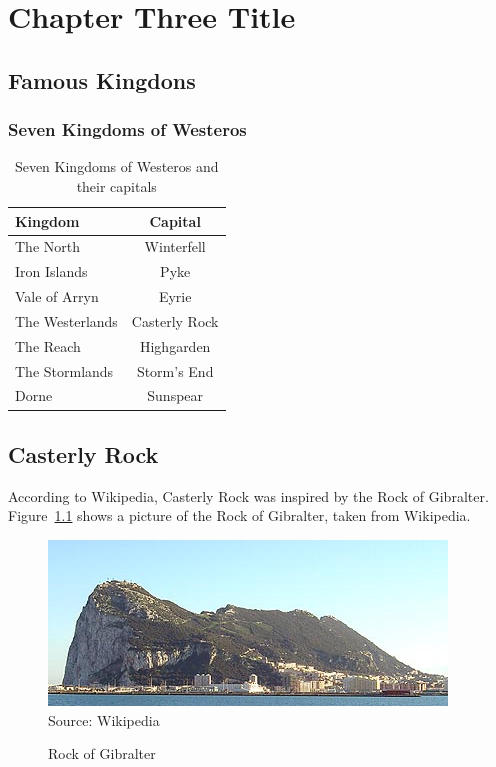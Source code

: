 
\chapter{Chapter Three Title}
\label{chap:chapterthreename}
\doublespacing
{}

\section{Famous Kingdons}

\subsection{Seven Kingdoms of Westeros}

\begin{table}
\centering
\caption{Seven Kingdoms of Westeros and their capitals}
\begin{tabular}{lc}
\toprule
Kingdom & Capital \\
\midrule
The North  & Winterfell \\
Iron Islands & Pyke \\
Vale of Arryn & Eyrie \\
The Westerlands & Casterly Rock \\
The Reach & Highgarden \\
The Stormlands & Storm's End \\
Dorne & Sunspear \\
\bottomrule
\end{tabular}
\end{table}

\section{Casterly Rock}
According to Wikipedia, Casterly Rock was inspired by the Rock of Gibralter.
Figure~\ref{fig:rock} shows a picture of the Rock of Gibralter, taken from Wikipedia.

\begin{figure}
\centering
\caption{Rock of Gibralter}
\label{fig:rock}
\includegraphics[width=\textwidth]{chapterthreename/figures/Rock_of_Gibraltar_northwest.jpg}
\tiny Source: Wikipedia
\end{figure}





